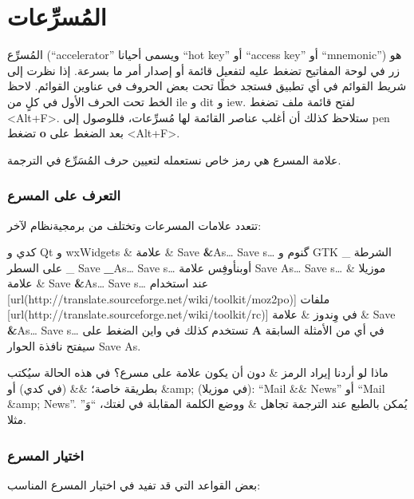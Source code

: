 \section[ref:34484726]{المُسرِّعات}
المُسرِّع (“accelerator” ويسمى
أحيانا “hot key” أو “access key” أو “mnemonic”) هو زر في لوحة المفاتيح
تضغط عليه لتفعيل قائمة أو إصدار أمر ما بسرعة. إذا نظرت إلى شريط القوائم
في أي تطبيق فستجد خطًا تحت بعض الحروف في عناوين القوائم. لاحظ الخط تحت
الحرف الأول في كلٍ من ile و dit و
iew. لفتح قائمة ملف تضغط <Alt+F>. ستلاحظ كذلك أن أغلب عناصر
القائمة لها مُسرِّعات، فللوصول إلى pen تضغط {\bf o} بعد
الضغط على <Alt+F>.

علامة المسرع هي رمز خاص نستعمله لتعيين حرف المُسَرِّع في الترجمة.

\subsubsection{التعرف على المسرع}
تتعدد علامات المسرعات وتختلف من برمجية نظام لآخر:

\starttable[|l|l|l|l|l|l|]
\HL
\NC {} \NC {} \NC
{} \NC {} \NC
{} \NC {}\NC\AR
\HL
\NC كدي و Qt و wxWidgets \NC \&  \NC علامة \& \NC Save {\bf \&}As…  \NC
Save s… \NC \NC\AR
\HL
\NC گنوم و GTK \NC \_  \NC الشرطة على السطر \_ \NC Save {\bf \_}As…  \NC
Save s… \NC \NC\AR
\HL
\NC أوبن​أوفِس \NC {}   \NC علامة   \NC Save {\bf
{} }As…  \NC Save s… \NC \NC\AR
\HL
\NC موزيلا \NC \&  \NC علامة \& \NC Save {\bf \&}As…  \NC Save
s… \NC عند استخدام
[url(http://translate.sourceforge.net/wiki/toolkit/moz2po)]
\NC\AR
\HL
\NC ملفات [url(http://translate.sourceforge.net/wiki/toolkit/rc)]
في وِندوز  \NC \&  \NC علامة \& \NC Save {\bf \&}As…  \NC Save
s… \NC تستخدم كذلك في واين\NC\AR
\HL
\stoptable
الضغط على {\bf A} في أي من الأمثلة السابقة سيفتح نافذة الحوار Save As.

ماذا لو أردنا إيراد الرمز \& دون أن يكون علامة على مسرع؟ في هذه الحالة
سيُكتب بطريقة خاصة؛ \&\& (في كدي) أو ‪\&amp;‬ (في موزيلا): “Mail \&\&
News” أو “Mail \&amp; News”. يُمكن بالطبع عند الترجمة تجاهل \& ووضع
الكلمة المقابلة في لغتك، “وَ” مثلا.

\subsubsection{اختيار المسرع}
بعض القواعد التي قد تفيد في اختيار المسرع المناسب:

